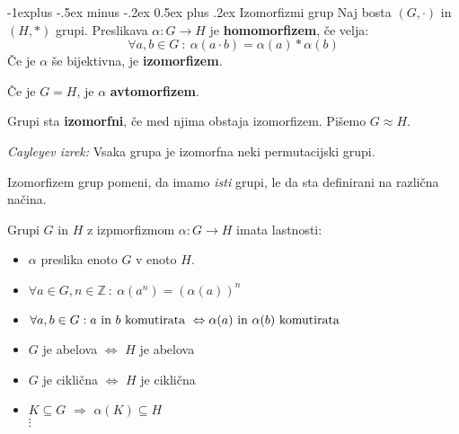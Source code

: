 \documentclass[a4paper,8pt]{extarticle}
\makeatletter
\renewcommand{\subsection}{\@startsection{subsection}{2}{0mm}%
                                {-1explus -.5ex minus -.2ex}%
                                {0.5ex plus .2ex}%
                                {\normalfont\normalsize\bfseries}}
\makeatother
\begin{document}
\begin{multicols}{4}
\subsection{Izomorfizmi grup}
Naj bosta $(G, \cdot )$ in $(H, *)$ grupi. Preslikava $\alpha : G \to H$ je \textbf{homomorfizem}, če velja:
\[ \forall a, b  \in G\ :\ \alpha(a \cdot b) = \alpha(a) * \alpha(b) \]
Če je $\alpha$ še bijektivna, je \textbf{izomorfizem}.

Če je $G = H$, je $\alpha$ \textbf{avtomorfizem}.

Grupi sta \textbf{izomorfni}, če med njima obstaja izomorfizem. Pišemo $G \approx H$.

\emph{Cayleyev izrek:} Vsaka grupa je izomorfna neki permutacijski grupi.

Izomorfizem grup pomeni, da imamo \emph{isti} grupi, le da sta definirani na različna načina.

Grupi $G$ in $H$ z izpmorfizmom $\alpha: G \to H$ imata lastnosti:
\begin{itemize}
    \item $\alpha$ preslika enoto $G$ v enoto $H$.
    \item $\forall a \in G, n \in \mathbb{Z}\ :\ \alpha(a^n) = \left( \alpha(a) \right)^n$
    \item $\forall a,b \in G : a \textmd{ in } b \textmd{ komutirata } \Leftrightarrow \alpha(a) \textmd{ in } \alpha(b) \textmd{ komutirata }$
    \item $G$ je abelova $\Leftrightarrow$ $H$ je abelova
    \item $G$ je ciklična $\Leftrightarrow$ $H$ je ciklična
    \item $K \subseteq G$ $\Rightarrow$ $\alpha(K) \subseteq H$\\
    $\vdots$
\end{itemize}



\end{multicols}
\end{document}
